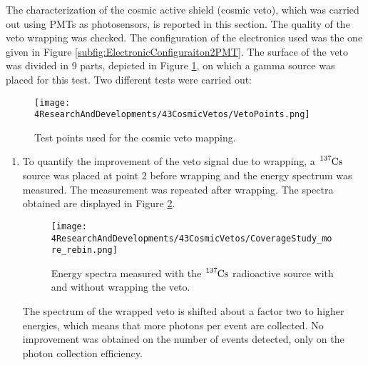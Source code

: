 The characterization of the cosmic active shield (cosmic veto), which was carried out using PMTs as photosensors, is reported in this section. The quality of the veto wrapping was checked. The configuration of the electronics used was the one given in Figure \ref{subfig:ElectronicConfiguraiton2PMT}. The surface of the veto was divided in 9 parts, depicted in Figure \ref{fig:MappingPoints}, on which a gamma source was placed for this test. Two different tests were carried out:

\begin{figure}[h]
\centering
\texttt{[image: 4ResearchAndDevelopments/43CosmicVetos/VetoPoints.png]}
\caption{Test points used for the cosmic veto mapping.\label{fig:MappingPoints}}
\end{figure}
\begin{enumerate}

\item{} To quantify the improvement of the veto signal due to wrapping, a $\ce{^{137}Cs}$ source was placed at point 2 before wrapping and the energy spectrum was measured. The measurement was repeated after wrapping. The spectra obtained are displayed in Figure \ref{fig:VetoCoverageImprovement}.

\begin{figure}[h]
\centering
\texttt{[image: 4ResearchAndDevelopments/43CosmicVetos/CoverageStudy\_more\_rebin.png]}
\caption{Energy spectra measured with the $\ce{^{137}Cs}$ radioactive source with and without wrapping the veto.\label{fig:VetoCoverageImprovement}}
\end{figure}

The spectrum of the wrapped veto is shifted about a factor two to higher energies, which means that more photons per event are collected. No improvement was obtained on the number of events detected, only on the photon collection efficiency.



\end{enumerate}
